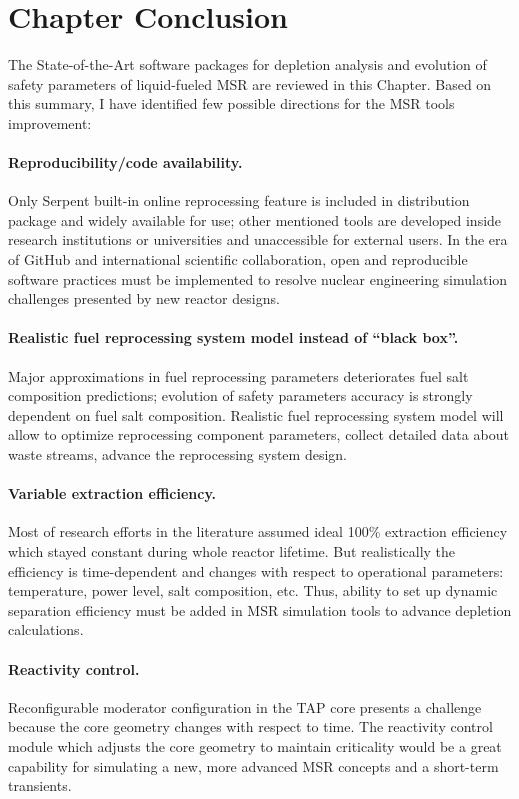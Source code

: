 \section{Chapter Conclusion}
The State-of-the-Art software packages for depletion analysis and evolution of 
safety parameters of liquid-fueled \gls{MSR} are reviewed in this Chapter. 
Based on this summary, I have identified few possible directions for 
the \gls{MSR} tools improvement:
\paragraph{Reproducibility/code availability.} Only Serpent built-in online 
reprocessing feature is included in distribution package and widely available 
for use; other mentioned tools are developed inside research institutions or 
universities and unaccessible for external users. In the era of GitHub 
\cite{github_github_2015} and international scientific collaboration, open and 
reproducible software practices must be implemented to resolve nuclear 
engineering simulation challenges presented by new reactor designs.
\paragraph{Realistic fuel reprocessing system model instead of ``black box''.} 
Major approximations in fuel reprocessing parameters deteriorates fuel salt 
composition predictions; evolution of safety parameters accuracy is strongly 
dependent on fuel salt composition. Realistic fuel reprocessing system model 
will allow to optimize reprocessing component parameters, collect detailed 
data about waste streams, advance the reprocessing system design.
\paragraph{Variable extraction efficiency.} Most of research efforts in the 
literature assumed ideal 100\% extraction efficiency which stayed constant 
during whole reactor lifetime. But realistically the efficiency is 
time-dependent and changes with respect to operational parameters: 
temperature, power level, salt composition, etc. Thus, ability to set up 
dynamic separation efficiency must be added in \gls{MSR} simulation tools to 
advance depletion calculations.
\paragraph{Reactivity control.} Reconfigurable moderator configuration in the 
\gls{TAP} core presents a challenge because the core geometry changes with 
respect to time. The reactivity control module which adjusts the core geometry 
to maintain criticality would be a great capability for simulating a new, more 
advanced \gls{MSR} concepts and a short-term transients.
